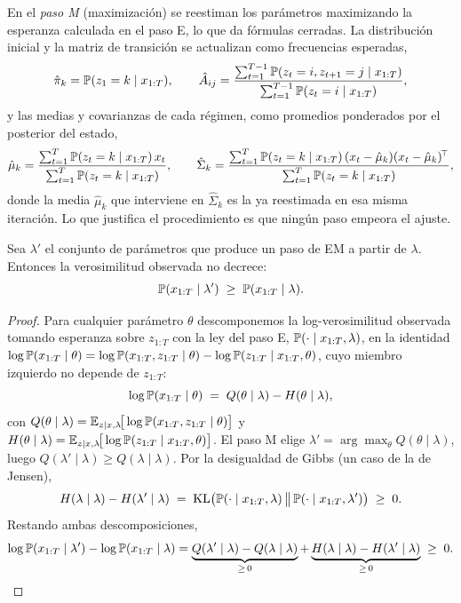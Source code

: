 En el \emph{paso M} (maximización) se reestiman los parámetros maximizando la esperanza calculada en el paso E, lo que da fórmulas cerradas. La distribución inicial y la matriz de transición se actualizan como frecuencias esperadas,
\[
\hat{\pi}_k = \mathbb{P}(z_1 = k \mid x_{1:T}),
\qquad
\hat{A}_{ij} = \frac{\sum_{t=1}^{T-1} \mathbb{P}(z_t = i, z_{t+1} = j \mid x_{1:T})}{\sum_{t=1}^{T-1} \mathbb{P}(z_t = i \mid x_{1:T})},
\]
y las medias y covarianzas de cada régimen, como promedios ponderados por el posterior del estado,
\[
\hat{\mu}_k = \frac{\sum_{t=1}^{T} \mathbb{P}(z_t = k \mid x_{1:T})\, x_t}{\sum_{t=1}^{T} \mathbb{P}(z_t = k \mid x_{1:T})},
\qquad
\hat{\Sigma}_k = \frac{\sum_{t=1}^{T} \mathbb{P}(z_t = k \mid x_{1:T})\, (x_t - \hat{\mu}_k)(x_t - \hat{\mu}_k)^{\!\top}}{\sum_{t=1}^{T} \mathbb{P}(z_t = k \mid x_{1:T})},
\]
donde la media $\hat{\mu}_k$ que interviene en $\hat{\Sigma}_k$ es la ya reestimada en esa misma iteración. Lo que justifica el procedimiento es que ningún paso empeora el ajuste.

\begin{lema}[Monotonía de EM]
\label{lem:em}
Sea $\lambda'$ el conjunto de parámetros que produce un paso de EM a partir de $\lambda$. Entonces la verosimilitud observada no decrece:
\[
\mathbb{P}(x_{1:T} \mid \lambda') \;\ge\; \mathbb{P}(x_{1:T} \mid \lambda).
\]
\end{lema}

\begin{proof}
Para cualquier parámetro $\theta$ descomponemos la log-verosimilitud observada tomando esperanza sobre $z_{1:T}$ con la ley del paso E, $\mathbb{P}(\cdot \mid x_{1:T}, \lambda)$, en la identidad $\log\mathbb{P}(x_{1:T}\mid\theta) = \log\mathbb{P}(x_{1:T}, z_{1:T}\mid\theta) - \log\mathbb{P}(z_{1:T}\mid x_{1:T}, \theta)$, cuyo miembro izquierdo no depende de $z_{1:T}$:
\[
\log\mathbb{P}(x_{1:T} \mid \theta) \;=\; Q(\theta \mid \lambda) - H(\theta \mid \lambda),
\]
con $Q(\theta\mid\lambda) = \mathbb{E}_{z\mid x,\lambda}\!\big[\log\mathbb{P}(x_{1:T}, z_{1:T}\mid\theta)\big]$ y $H(\theta\mid\lambda) = \mathbb{E}_{z\mid x,\lambda}\!\big[\log\mathbb{P}(z_{1:T}\mid x_{1:T},\theta)\big]$. El paso M elige $\lambda' = \arg\max_{\theta} Q(\theta\mid\lambda)$, luego $Q(\lambda'\mid\lambda) \ge Q(\lambda\mid\lambda)$. Por la desigualdad de Gibbs (un caso de la de Jensen),
\[
H(\lambda\mid\lambda) - H(\lambda'\mid\lambda) \;=\; \mathrm{KL}\big(\mathbb{P}(\cdot\mid x_{1:T},\lambda)\,\big\|\,\mathbb{P}(\cdot\mid x_{1:T},\lambda')\big) \;\ge\; 0.
\]
Restando ambas descomposiciones,
\[
\log\mathbb{P}(x_{1:T}\mid\lambda') - \log\mathbb{P}(x_{1:T}\mid\lambda)
= \underbrace{Q(\lambda'\mid\lambda) - Q(\lambda\mid\lambda)}_{\ge\, 0}
+ \underbrace{H(\lambda\mid\lambda) - H(\lambda'\mid\lambda)}_{\ge\, 0} \;\ge\; 0. \qedhere
\]
\end{proof}

